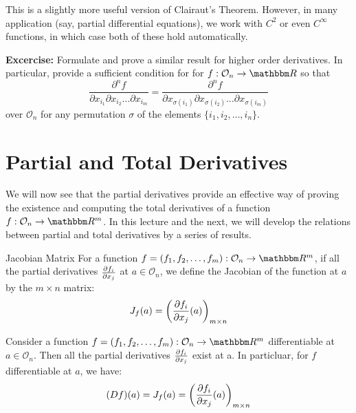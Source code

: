 \documentclass[../Analysis-3]{subfiles}
\begin{document}
This is a slightly more useful version of Clairaut's Theorem. However, in many application (say, partial differential equations), we work with $C^2$ or even $C^\infty$ functions, in which case both of these hold automatically.\\

\vspace{.2 cm}

\textbf{Excercise:} Formulate and prove a similar result for higher order derivatives. In particular, provide a sufficient condition for  for $f: \mathcal{O}_n \to \R$ so that
\[\frac{\partial^n f}{\partial x_{i_1} \partial x_{i_2} \dots \partial x_{i_m}} = \frac{\partial^n f}{\partial x_{\sigma(i_1)} \partial x_{\sigma(i_2)} \dots \partial x_{\sigma(i_m)}}\]
over $\mathcal{O}_n$ for any permutation $\sigma$ of the elements $\{i_1,i_2,\dots,i_n\}$.

\section{Partial and Total Derivatives}

We will now see that the partial derivatives provide an effective way of proving the existence and computing the total derivatives of a function $f: \mathcal{O}_n \to \R^m$. In this lecture and the next, we will develop the relations between partial and total derivatives by a series of results.

\begin{Def}{Jacobian Matrix}{}
  For a function $f = (f_1, f_2, \dots, f_m): \mathcal{O}_n \to \R^m$, if all the partial derivatives $\pdv{f_i}{x_j}$ at $a \in \mathcal{O}_n$, we define the Jacobian of the function at $a$ by the $m \times n$ matrix:
  \[J_f(a) = \left( \pdv{f_i}{x_j}\/(a) \right)_{m \times n}\]
\end{Def}

\begin{Thm}{}{}\label{thm2:7}
  Consider a function $f = (f_1, f_2, \dots, f_m): \mathcal{O}_n \to \R^m$ differentiable at $a \in \mathcal{O}_n$. Then all the partial derivatives $\pdv{f_i}{x_j}$ exist at a. In particluar, for $f$ differentiable at $a$, we have:
  \[(Df)(a) = J_f(a) = \left( \pdv{f_i}{x_j} \/ (a)\right)_{m \times n}\]
\end{Thm}
\end{document}
